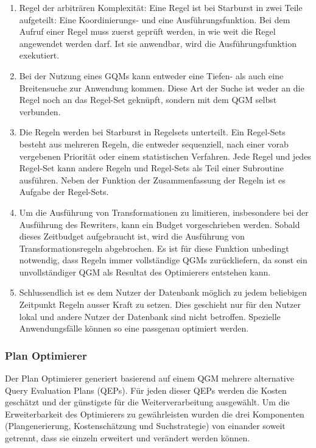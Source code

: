 \begin{enumerate}
\item Regel der arbiträren Komplexität: Eine Regel ist bei Starburst in zwei Teile aufgeteilt: Eine Koordinierungs- und eine Ausführungsfunktion. Bei dem Aufruf einer Regel muss zuerst geprüft werden, in wie weit die Regel angewendet werden darf. Ist sie anwendbar, wird die Ausführungsfunktion exekutiert.

\item Bei der Nutzung eines GQMs kann entweder eine Tiefen- als auch eine Breitensuche zur Anwendung kommen. Diese Art der Suche ist weder an die Regel noch an das Regel-Set geknüpft, sondern mit dem QGM selbst verbunden.


\item Die Regeln werden bei Starburst in Regelsets unterteilt. Ein Regel-Sets besteht aus mehreren Regeln, die entweder sequenziell, nach einer vorab vergebenen Priorität oder einem statistischen Verfahren. Jede Regel und jedes Regel-Set kann andere Regeln und Regel-Sets als Teil einer Subroutine ausführen. Neben der Funktion der Zusammenfassung der Regeln ist es Aufgabe der Regel-Sets.

\item Um die Ausführung von Transformationen zu limitieren, insbesondere bei der Ausführung des Rewriters, kann ein Budget vorgeschrieben werden. Sobald dieses Zeitbudget aufgebraucht ist, wird die Ausführung von Transformationsregeln abgebrochen. Es ist für diese Funktion unbedingt notwendig, dass Regeln immer vollständige QGMs zurückliefern, da sonst ein unvollständiger QGM als Resultat des Optimierers entstehen kann.

\item Schlussendlich ist es dem Nutzer der Datenbank möglich zu jedem beliebigen Zeitpunkt Regeln ausser Kraft zu setzen. Dies geschieht nur für den Nutzer lokal und andere Nutzer der Datenbank sind nicht betroffen. Spezielle Anwendungsfälle können so eine passgenau optimiert werden.
\end{enumerate}

\subsubsection{Plan Optimierer}

Der Plan Optimierer generiert basierend auf einem QGM mehrere alternative Query Evaluation Plans (QEPs). Für jeden dieser QEPs werden die Kosten geschätzt und der günstigste für die Weiterverarbeitung ausgewählt. Um die Erweiterbarkeit des Optimierers zu gewährleisten wurden die drei Komponenten (Plangenerierung, Kostenschätzung und Suchstrategie) von einander soweit getrennt, dass sie einzeln erweitert und verändert werden können. 

